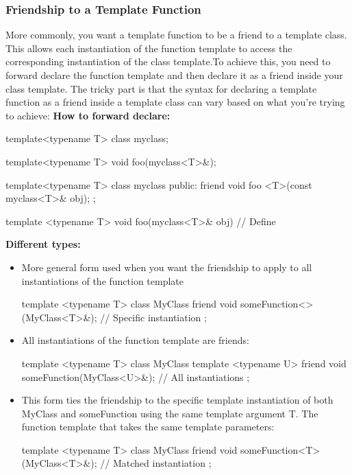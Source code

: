\documentclass{report}
\begin{document}
    \subsubsection{Friendship to a Template Function}
    \bigbreak \noindent 
    More commonly, you want a template function to be a friend to a template class. This allows each instantiation of the function template to access the corresponding instantiation of the class template.To achieve this, you need to forward declare the function template and then declare it as a friend inside your class template. The tricky part is that the syntax for declaring a template function as a friend inside a template class can vary based on what you're trying to achieve:
     \bigbreak \noindent 
    \textbf{How to forward declare:}
    \bigbreak \noindent 
    \begin{cppcode}
    template<typename T>
    class myclass;

    template<typename T>
    void foo(myclass<T>&); 


    template<typename T>
    class myclass {
    public:
        friend void foo <T>(const myclass<T>& obj);
    };

    template <typename T>
    void foo(myclass<T>& obj) {
        // Define
    }
    \end{cppcode}
    \pagebreak 
    \textbf{Different types:}
    \begin{itemize}
        \item More general form used when you want the friendship to apply to all instantiations of the function template
            \bigbreak \noindent 
            \begin{cppcode}
                template <typename T>
                class MyClass {
                    friend void someFunction<>(MyClass<T>&); // Specific instantiation
                };
            \end{cppcode}
        \item All instantiations of the function template are friends:
            \bigbreak \noindent 
            \begin{cppcode}
                template <typename T>
                class MyClass {
                    template <typename U>
                    friend void someFunction(MyClass<U>&); // All instantiations
                };
            \end{cppcode}
        \item This form ties the friendship to the specific template instantiation of both MyClass and someFunction using the same template argument T. The function template that takes the same template parameters:
            \bigbreak \noindent 
            \begin{cppcode}
                template <typename T>
                class MyClass {
                    friend void someFunction<T>(MyClass<T>&); // Matched instantiation
                };
            \end{cppcode}
    \end{itemize}
\end{document}
